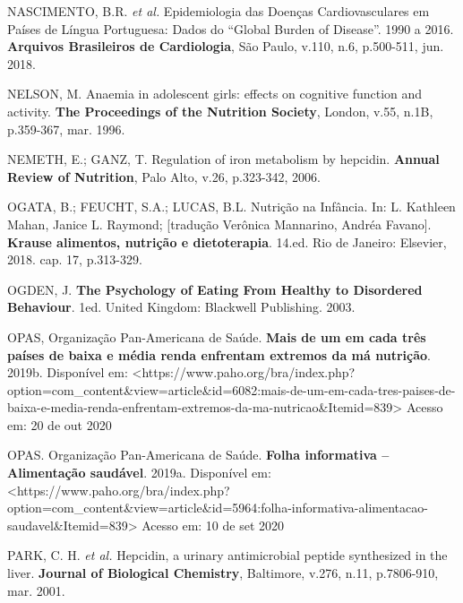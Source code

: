 \bigbreak

\noindent NASCIMENTO, B.R. \textit{et al.} Epidemiologia das Doenças Cardiovasculares em Países de Língua Portuguesa: Dados do “Global Burden of Disease”. 1990 a 2016. \textbf{Arquivos Brasileiros de Cardiologia}, São Paulo, v.110, n.6, p.500-511, jun. 2018.

\bigbreak

\noindent NELSON, M. Anaemia in adolescent girls: effects on cognitive function and activity. \textbf{The Proceedings of the Nutrition Society}, London, v.55, n.1B, p.359-367, mar. 1996.

\bigbreak

\noindent NEMETH, E.; GANZ, T. Regulation of iron metabolism by hepcidin. \textbf{Annual Review of Nutrition}, Palo Alto, v.26, p.323-342, 2006.

\bigbreak

\noindent OGATA, B.; FEUCHT, S.A.; LUCAS, B.L. Nutrição na Infância. In: L. Kathleen Mahan, Janice L. Raymond; [tradução Verônica Mannarino, Andréa Favano]. \textbf{Krause alimentos, nutrição e dietoterapia}. 14.ed. Rio de Janeiro: Elsevier, 2018. cap. 17, p.313-329.

\bigbreak

\noindent OGDEN, J. \textbf{The Psychology of Eating From Healthy to Disordered Behaviour}. 1ed. United Kingdom: Blackwell Publishing. 2003.

\bigbreak

\noindent OPAS, Organização Pan-Americana de Saúde. \textbf{Mais de um em cada três países de baixa e média renda enfrentam extremos da má nutrição}. 2019b. Disponível em: <https://www.paho.org/bra/index.php?option=com\_content\&view=article\&id=6082:mais-de-um-em-cada-tres-paises-de-baixa-e-media-renda-enfrentam-extremos-da-ma-nutricao\&Itemid=839> Acesso em: 20 de out 2020

\bigbreak

\noindent OPAS. Organização Pan-Americana de Saúde. \textbf{Folha informativa – Alimentação saudável}. 2019a. Disponível em: <https://www.paho.org/bra/index.php?option=com\_content\&view=article\&id=5964:folha-informativa-alimentacao-saudavel\&Itemid=839> Acesso em: 10 de set 2020

\bigbreak

\noindent PARK, C. H. \textit{et al.} Hepcidin, a urinary antimicrobial peptide synthesized in the liver. \textbf{Journal of Biological Chemistry}, Baltimore, v.276, n.11, p.7806-910, mar. 2001.

\bigbreak

